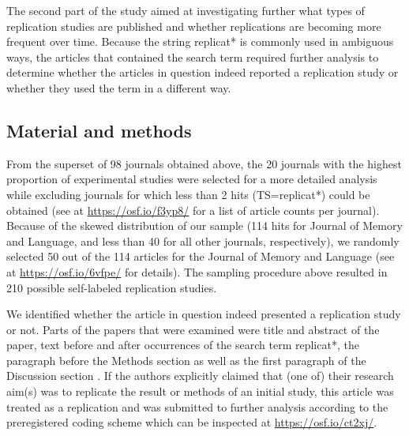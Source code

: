 \documentclass[cm,linguex]{glossa}
\begin{document}
The second part of the study aimed at investigating further what types of replication studies are published and whether replications are becoming more frequent over time.
Because the string replicat* is commonly used in ambiguous ways, the articles that contained the search term required further analysis to determine whether the articles in question indeed reported a replication study or whether they used the term in a different way.

\hypertarget{material-and-methods-1}{%
\subsection{Material and methods}\label{material-and-methods-1}}

From the superset of 98 journals obtained above, the 20 journals with the highest proportion of experimental studies were selected for a more detailed analysis while excluding journals for which less than 2 hits (TS=replicat*) could be obtained (see at \url{https://osf.io/f3yp8/} for a list of article counts per journal).
Because of the skewed distribution of our sample (114 hits for Journal of Memory and Language, and less than 40 for all other journals, respectively), we randomly selected 50 out of the 114 articles for the Journal of Memory and Language (see at \url{https://osf.io/6vfpe/} for details).
The sampling procedure above resulted in 210 possible self-labeled replication studies.

We identified whether the article in question indeed presented a replication study or not.
Parts of the papers that were examined were title and abstract of the paper, text before and after occurrences of the search term replicat*, the paragraph before the Methods section as well as the first paragraph of the Discussion section \citep[following and adapting the procedure specified by][]{makel_replication_2016}.
If the authors explicitly claimed that (one of) their research aim(s) was to replicate the result or methods of an initial study, this article was treated as a replication and was submitted to further analysis according to the preregistered coding scheme which can be inspected at \url{https://osf.io/ct2xj/}.
\end{document}
